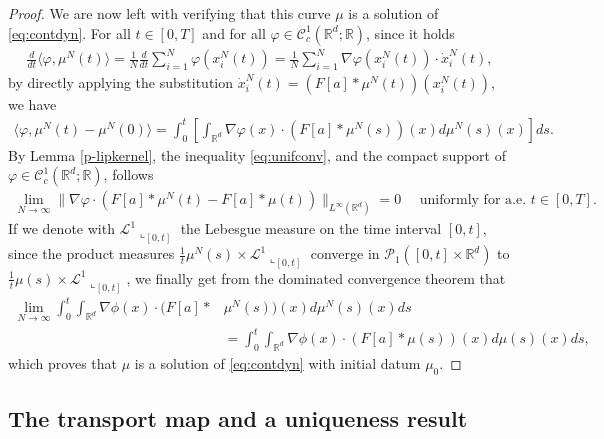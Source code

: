 \documentclass[A4paper,11pt]{article}
\theoremstyle{definition}
\newcommand{\R}{\mathbb{R}}
\begin{document}
\begin{proof}
We are now left with verifying that this curve $\mu$ is a solution of \eqref{eq:contdyn}. For all $t \in [0,T]$ and for all $\varphi \in \mathcal{C}^1_c(\R^d;\R)$, since it holds
\begin{align*}
\frac{d}{dt}\langle \varphi, \mu^N(t) \rangle = \frac{1}{N}\frac{d}{dt} \sum^N_{i = 1} \varphi(x^N_i(t)) = \frac{1}{N} \sum^N_{i = 1} \nabla\varphi(x^N_i(t)) \cdot \dot{x}_i^N(t),
\end{align*}
by directly applying the substitution $\dot{x}_i^N(t) = (F[a]*\mu^N(t))(x^N_i(t))$, we have
\begin{align*}
\langle \varphi, \mu^N(t) - \mu^N(0) \rangle = \int^t_0 \left[ \int_{\R^d}\nabla \varphi(x) \cdot (F[a]*\mu^N(s))(x) d\mu^N(s)(x) \right] ds.
\end{align*}
By Lemma \ref{p-lipkernel}, the inequality \eqref{eq:unifconv}, and the compact support of $\varphi \in \mathcal{C}^1_c(\R^d;\R)$, follows
\begin{align*}
\lim_{N \rightarrow \infty} \|\nabla\varphi \cdot (F[a]*\mu^N(t) - F[a]*\mu(t))\|_{L^{\infty}(\R^d)} = 0 \quad \text{ uniformly for a.e. } t \in [0,T].
\end{align*}
If we denote with $\mathcal L^1\llcorner_{[0,t]}$ the Lebesgue measure on the time interval $[0,t]$, since the product measures $\frac{1}{t} \mu^{N}(s) \times \mathcal L^1\llcorner_{[0,t]}$ converge in $\mathcal P_1([0,t] \times \mathbb R^{d})$ to $\frac{1}{t} \mu(s) \times \mathcal L^1\llcorner_{[0,t]}$, we finally get from the dominated convergence theorem that
\begin{align*}
\lim_{N \to \infty} \int_0^{t} \int_{\mathbb R^{d}} \nabla \phi(x) \cdot (F[a]*&\mu^N(s))(x) d\mu^N(s)(x) ds \\
&=  \int_0^{t} \int_{\mathbb R^{d}} \nabla \phi(x) \cdot (F[a]*\mu(s))(x) d \mu(s)(x) ds,
\end{align*}
which proves that $\mu$ is a solution of \eqref{eq:contdyn} with initial datum $\mu_0$.
\end{proof}

\subsection{The transport map and a uniqueness result}
\end{document}
